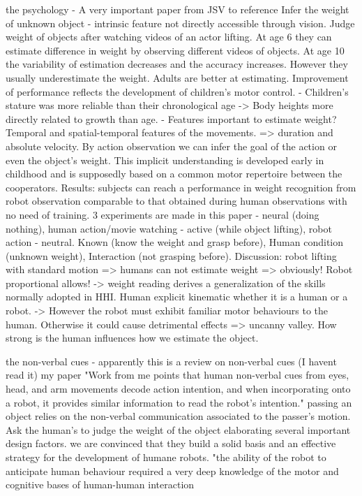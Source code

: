 the psychology -
\cite{jamone_affordances_2018} A very important paper from JSV to reference
 \cite{sciutti_development_2019}
Infer the weight of unknown object - intrinsic feature not directly accessible through vision. Judge weight of objects after watching videos of an actor lifting. At age 6 they can estimate difference in weight by observing different videos of objects. At age 10 the variability of estimation decreases and the accuracy increases. However they usually underestimate the weight. Adults are better at estimating. Improvement of performance reflects the development of children's motor control. - Children's stature was more reliable than their chronological age -> Body heights more directly related to growth than age. - Features important to estimate weight? Temporal and spatial-temporal features of the movements. => duration and absolute velocity. 
 \cite{sciutti_understanding_2014}
By action observation we can infer the goal of the action or even the object's weight. This implicit understanding is developed early in childhood and is supposedly based on a common motor repertoire between the cooperators. Results: subjects can reach a performance in weight recognition from robot observation comparable to that obtained during human observations with no need of training. 3 experiments are made in this paper - neural (doing nothing), human action/movie watching - active (while object lifting), robot action - neutral. Known (know the weight and grasp before), Human condition (unknown weight), Interaction (not grasping before). 
Discussion: robot lifting with standard motion => humans can not estimate weight => obviously! Robot proportional allows! -> weight reading derives a generalization of the skills normally adopted in HHI. Human explicit kinematic whether it is a human or a robot. -> However the robot must exhibit familiar motor behaviours to the human. Otherwise it could cause detrimental effects => uncanny valley. How strong is the human influences how we estimate the object. 

the non-verbal cues -
\cite{mavridis_review_2015} apparently this is a review on non-verbal cues (I havent read it)
\cite{duarte_action_2018} my paper "Work from me points that human non-verbal cues from eyes, head, and arm movements decode action intention, and when incorporating onto a robot, it provides similar information to read the robot's intention."
\cite{palinko_communicative_2015} passing an object relies on the non-verbal communication associated to the passer's motion. Ask the human's to judge the weight of the object
\cite{sciutti_humanizing_2018} elaborating several important design factors. we are convinced that they build a solid basis and an effective strategy for the development of humane robots. "the ability of the robot to anticipate human behaviour required a very deep knowledge of the motor and cognitive bases of human-human interaction
\cite{admoni_robot_2016} 

